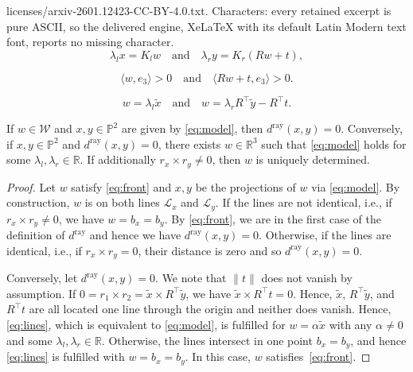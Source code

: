 \documentclass[10pt,a4paper]{amsart}
\newcommand{\R}{{\ensuremath{\mathbb{R}}}}
\begin{document}
licenses/arxiv-2601.12423-CC-BY-4.0.txt. Characters: every retained excerpt is pure ASCII, so the delivered engine, XeLaTeX with its default Latin Modern text font, reports no missing character.
\begin{equation} \label{eq:model}
\lambda_l x = K_l w 
\quad \text{and} \quad
\lambda_r y = K_r (Rw + t),
\end{equation}

\begin{equation} \label{eq:front}
\langle w, e_3\rangle>0 \quad \text{and} \quad \langle Rw+t,e_3\rangle>0.
\end{equation}

\begin{equation} \label{eq:lines}
        w = \lambda_l \tilde x 
        \quad \text{and} \quad
        w = \lambda_r R^\top \tilde y - R^\top t.
\end{equation} 

\begin{proposition}
\label{prop:ray_distance_pseudo_definite_property}
    If $w\in\mathcal W$ and $x,y\in\mathbb P^2$ are given by \eqref{eq:model},
    then $d^\mathrm{ray}(x,y)=0$.
    Conversely, if $x,y\in\mathbb P^2$ and $d^\mathrm{ray}(x,y)=0$, 
    there exists $w\in\R^3$ such that \eqref{eq:model} holds for some $\lambda_l,\lambda_r\in\R$. 
    If additionally $r_x \times r_y \neq 0$, then $w$ is uniquely determined.
\end{proposition}

\begin{proof}
Let $w$ satisfy \eqref{eq:front} and $x,y$ be the projections of $w$ via \eqref{eq:model}. 
By construction, 
$w$ is on both lines $\mathcal L_x$ and $\mathcal L_y$.
If the lines are not identical, i.e., if $r_x\times r_y\neq0$, we have $w=b_x=b_y$.
By \eqref{eq:front}, we are in the first case of the definition of $d^\mathrm{ray}$ and hence we have $d^\mathrm{ray}(x,y)=0$.
Otherwise, if the lines are identical, i.e., if $r_x\times r_y=0$, their distance is zero and so $d^\mathrm{ray}(x,y)=0$.

Conversely, let $d^\mathrm{ray}(x,y)=0$.
We note that $\|t\|$ does not vanish by assumption.
If $0=r_1\times r_2 = \tilde x\times R^\top\tilde y$, we have $\tilde x\times R^\top t=0$.
Hence, $\tilde x$, $R^\top\tilde y$, and $R^\top t$ are all located one line through the origin and neither does vanish.
Hence, \eqref{eq:lines}, which is equivalent to \eqref{eq:model}, is fulfilled for $w=\alpha \tilde x$ with any $\alpha\neq0$ and some $\lambda_l,\lambda_r\in\R$.
Otherwise, the lines intersect in one point $b_x=b_y$, and hence \eqref{eq:lines} is fulfilled with $w=b_x=b_y$.
In this case, $w$ satisfies~\eqref{eq:front}.
\end{proof}
\end{document}
